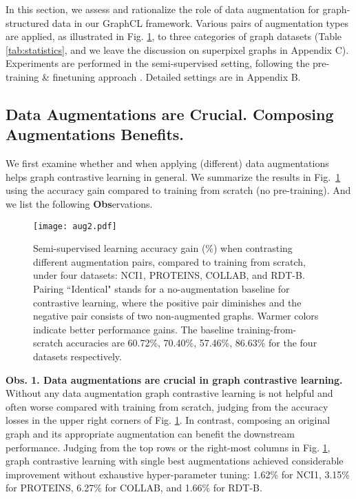 In this section, we assess and rationalize the role of data augmentation for graph-structured data in our GraphCL framework.
Various pairs of augmentation types are applied, as illustrated in Fig. \ref{fig:augvsaug}, to three categories of graph datasets (Table \ref{tab:statistics}, and we leave the discussion on superpixel graphs in Appendix C).  Experiments are performed in the semi-supervised setting, following the pre-training \& finetuning approach \cite{chen2020simple}.  
Detailed settings are in Appendix B.

\subsection{Data Augmentations are Crucial. Composing Augmentations Benefits.}
We first examine whether and when applying (different) data augmentations helps graph contrastive learning in general.  We summarize the results in Fig.~\ref{fig:augvsaug} using the accuracy gain compared to training from scratch (no pre-training).  And we list the following \textbf{Obs}ervations.

\begin{figure}[t] 
    \centering 
    \texttt{[image: aug2.pdf]}
    \caption{\small{Semi-supervised learning accuracy gain (\%) when contrasting different augmentation pairs, compared to training from scratch, under four datasets: NCI1, PROTEINS, COLLAB, and RDT-B. Pairing ``Identical" stands for a no-augmentation baseline for contrastive learning, where the positive pair diminishes and the negative pair consists of two non-augmented graphs. 
    Warmer colors indicate better performance gains.
    The baseline training-from-scratch accuracies are 60.72\%, 70.40\%, 57.46\%, 86.63\% for the four datasets respectively. } %
    } 
    \vspace{-1em}
    \label{fig:augvsaug} 
\end{figure}

\textbf{Obs. 1. Data augmentations are crucial in graph contrastive learning.}
Without any data augmentation graph contrastive learning  is not helpful and often worse compared with training from scratch, judging from the accuracy losses in the upper right corners of Fig. \ref{fig:augvsaug}.    
In contrast, composing an original graph and its appropriate augmentation can benefit the downstream performance.  Judging from the top rows or the right-most columns in Fig. \ref{fig:augvsaug}, graph contrastive learning with single best augmentations achieved considerable improvement without exhaustive hyper-parameter tuning:  1.62\% for NCI1, 3.15\% for PROTEINS, 6.27\% for COLLAB, and 1.66\% for RDT-B.  


